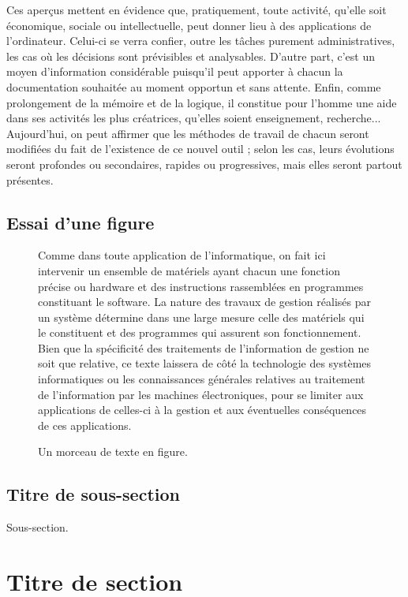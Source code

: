     Ces aper\c{c}us mettent en \'evidence que, pratiquement, toute activit\'e, qu'elle soit \'economique, sociale ou intellectuelle, peut donner lieu \`a des applications de l'ordinateur. Celui-ci se verra confier, outre les t\^aches purement administratives, les cas o\`u les d\'ecisions sont pr\'evisibles et analysables. D'autre part, c'est un moyen d'information consid\'erable puisqu'il peut apporter \`a chacun la documentation souhait\'ee au moment opportun et sans attente. Enfin, comme prolongement de la m\'emoire et de la logique, il constitue pour l'homme une aide dans ses activit\'es les plus cr\'eatrices, qu'elles soient enseignement, recherche... Aujourd'hui, on peut affirmer que les m\'ethodes de travail de chacun seront modifi\'ees du fait de l'existence de ce nouvel outil ; selon les cas, leurs \'evolutions seront profondes ou secondaires, rapides ou progressives, mais elles seront partout pr\'esentes.
        
    \subsection{Essai d'une figure}
    
    \begin{figure}[h]
    Comme dans toute application de l'informatique, on fait ici intervenir un ensemble de mat\'eriels ayant chacun une fonction pr\'ecise ou hardware et des instructions rassembl\'ees en programmes constituant le software. La nature des travaux de gestion r\'ealis\'es par un syst\`eme d\'etermine dans une large mesure celle des mat\'eriels qui le constituent et des programmes qui assurent son fonctionnement. Bien que la sp\'ecificit\'e des traitements de l'information de gestion ne soit que relative, ce texte laissera de c\^ot\'e la technologie des syst\`emes informatiques ou les connaissances g\'en\'erales relatives au traitement de l'information par les machines \'electroniques, pour se limiter aux applications de celles-ci \`a la gestion et aux \'eventuelles cons\'equences de ces applications.
		\caption{Un morceau de texte en figure.}
    \end{figure}
    
    \subsection{Titre de sous-section}

    Sous-section.
        
\section{Titre de section}

